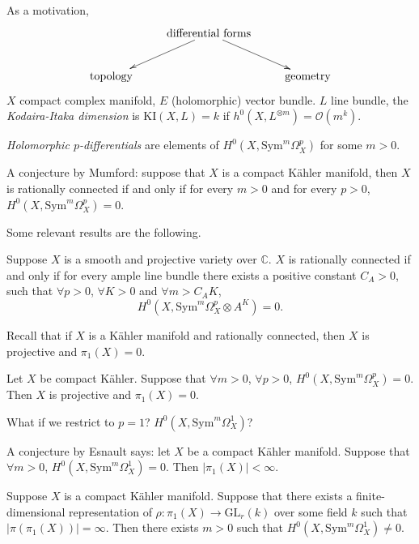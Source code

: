 \medskip\noindent



\noindent
As a motivation,
$$
\xymatrix{
&\text{differential forms}\ar[ld]\ar[rd]\\
\text{topology}&&\text{geometry}
}
$$
$X$ compact complex manifold, $E$
(holomorphic) vector bundle.
$L$ line bundle, the  {\it Kodaira-Itaka
dimension} is
$\text{KI}(X,L)=k$ if $h^0(X,L^{\otimes
m})=\mathcal{O}(m^k)$.

{\it Holomorphic $p$-differentials} are
elements of
$H^0(X,\text{Sym}^m\Omega^p_X)$ for some
$m>0$.

A conjecture by Mumford: suppose that $X$ is
a compact
Kähler manifold, then $X$ is rationally
connected if and only if
for every  $m>0$ and for every $p>0$,
$H^0(X,\text{Sym}^m\Omega^p_X)=0$.

Some relevant results are the following.

\begin{theorem}
\label{theorem-cdp}
Suppose $X$ is a smooth and projective
variety over $\mathbb{C}$.
$X$ is rationally connected if and only if
for every
ample line bundle there exists a positive
constant $C_A>0$,
such that $\forall p>0$, $\forall K>0$ and
$\forall m>C_A K$,
$$
H^0(X,\text{Sym}^m\Omega^p_X \otimes A^K)=0.
$$
\end{theorem}

\noindent
Recall that if $X$ is a Kähler manifold and
rationally connected,
then $X$ is projective and $\pi_1(X)=0$.

\begin{theorem}
\label{theorem-bc16}
Let $X$ be compact Kähler.
Suppose that $\forall m>0$, $\forall p>0$,
$H^0(X,\text{Sym}^m\Omega^p_X)=0$.
Then $X$ is projective and $\pi_1(X)=0$.
\end{theorem}

\noindent
What if we restrict to $p=1$?
$H^0(X,\text{Sym}^m\Omega^1_X)$?

A conjecture by Esnault says: let $X$ be a
compact Kähler manifold.
Suppose that $\forall m>0$,
$H^0(X,\text{Sym}^m\Omega^1_X)=0$.
Then $|\pi_1(X)|<\infty$.

\begin{theorem}
\label{theorem-bkt}
Suppose $X$ is a compact Kähler manifold.
Suppose that there exists a
finite-dimensional
representation of $\rho:\pi_1(X)\to
\text{GL}_r(k)$
over some field $k$ such that
$|\pi(\pi_1(X))|=\infty$.
Then there exists $m>0$ such that
 $H^0(X,\text{Sym}^m\Omega_X^1) \neq 0$.
\end{theorem}

